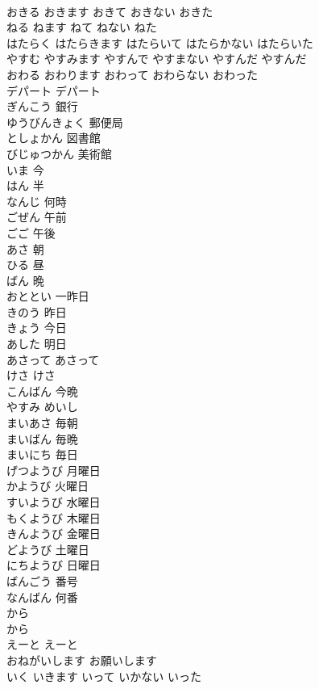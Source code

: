 \documentclass[8pt]{extreport}
\begin{document}
\begin{CJK}{UTF8}{min}
\\	おきる	おきます	おきて	おきない	おきた	
\\	ねる	ねます	ねて	ねない	ねた	
\\	はたらく	はたらきます	はたらいて	はたらかない	はたらいた	
\\	やすむ	やすみます	やすんで	やすまない	やすんだ	やすんだ
\\	おわる	おわります	おわって	おわらない	おわった	
\\	デパート	デパート
\\	ぎんこう	銀行
\\	ゆうびんきょく	郵便局
\\	としょかん	図書館
\\	びじゅつかん	美術館
\\	いま	今
\\	はん	半
\\	なんじ	何時
\\	ごぜん	午前
\\	ごご	午後
\\	あさ	朝
\\	ひる	昼
\\	ばん	晩
\\	おととい	一昨日
\\	きのう	昨日
\\	きょう	今日
\\	あした	明日
\\	あさって	あさって
\\	けさ	けさ
\\	こんばん	今晩
\\	やすみ	めいし 
\\	まいあさ	毎朝
\\	まいばん	毎晩
\\	まいにち	毎日
\\	げつようび	月曜日
\\	かようび	火曜日
\\	すいようび	水曜日
\\	もくようび	木曜日
\\	きんようび	金曜日
\\	どようび	土曜日
\\	にちようび	日曜日
\\	ばんごう	番号
\\	なんばん	何番
\\	から	
\\	から
\\	えーと	えーと
\\	おねがいします	お願いします
\\	いく	いきます	いって	いかない	いった	

\end{CJK}
\end{document}
